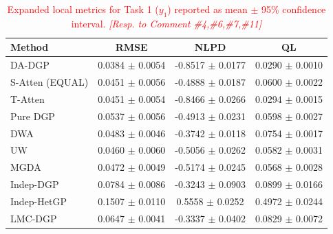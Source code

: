 \documentclass[11pt]{article}
\begin{document}
	\begin{table}[htbp]
		\centering
		\caption{\textcolor{red}{Expanded local metrics for Task 1 ($y_1$) reported as mean $\pm$ 95\% confidence interval. \textit{[Resp. to Comment \#4,\#6,\#7,\#11]}}}
		\label{tab:supp_task1_stats}
		{\color{red}\small
		\begin{tabular*}{\textwidth}{@{\extracolsep{\fill}}lccc}
			\toprule
			\textbf{Method} & \textbf{RMSE} & \textbf{NLPD} & \textbf{QL} \\
			\midrule
			DA-DGP & 0.0384 $\pm$ 0.0054 & -0.8517 $\pm$ 0.0177 & 0.0290 $\pm$ 0.0010 \\
			S-Atten (EQUAL) & 0.0451 $\pm$ 0.0056 & -0.4888 $\pm$ 0.0187 & 0.0600 $\pm$ 0.0022 \\
			T-Atten & 0.0451 $\pm$ 0.0054 & -0.8466 $\pm$ 0.0266 & 0.0294 $\pm$ 0.0015 \\
			Pure DGP & 0.0537 $\pm$ 0.0056 & -0.4913 $\pm$ 0.0231 & 0.0598 $\pm$ 0.0027 \\
			DWA & 0.0483 $\pm$ 0.0046 & -0.3742 $\pm$ 0.0118 & 0.0754 $\pm$ 0.0017 \\
			UW & 0.0460 $\pm$ 0.0060 & -0.5056 $\pm$ 0.0262 & 0.0582 $\pm$ 0.0031 \\
			MGDA & 0.0472 $\pm$ 0.0049 & -0.5174 $\pm$ 0.0245 & 0.0568 $\pm$ 0.0028 \\
			Indep-DGP & 0.0784 $\pm$ 0.0086 & -0.3243 $\pm$ 0.0903 & 0.0899 $\pm$ 0.0166 \\
			Indep-HetGP & 0.1507 $\pm$ 0.0110 & 0.5558 $\pm$ 0.0252 & 0.4972 $\pm$ 0.0244 \\
			LMC-DGP & 0.0647 $\pm$ 0.0041 & -0.3337 $\pm$ 0.0402 & 0.0829 $\pm$ 0.0072 \\
			\bottomrule
		\end{tabular*}
		}
	\end{table}
	
\end{document}
